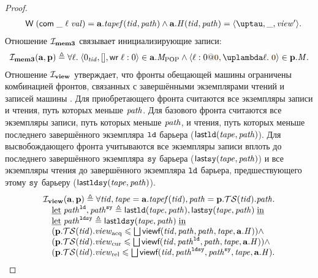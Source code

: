 \begin{proof}
\[\begin{array}{l}
  \quad  \tapeWrite{(\tapeWriteCommitted{\_}{\loc}{\stval})} = \aT.\tapef(\tId, \cpath) \land
      \aT.\hmap(\tId, \cpath) = \angled{\tau, \_, \R'}.
\end{array}\]
Отношение $\mathcal{I}_{\rm \bf mem3}$ связывает инициализирующие записи:
\[\begin{array}{l}
\invMemThree(\aT, \p) \triangleq
  \forall \loc. \; \stRequestWrite{0_{\tId}}{[]}{\loc}{0} \in \aT.\Mpop \land \writeEvt{\loc}{0}{\tstamp{0}}{\lambda \loc. \; \tstamp{0}} \in \p.\Mprom.
\end{array}\]
Отношение $\mathcal{I}_{\rm \bf view}$ утверждает, что фронты обещающей машины ограничены комбинацией
фронтов, связанных с завершёнными экземплярами чтений и записей машины \ARMt.
Для приобретающего фронта считаются все экземпляры записи и чтения, путь которых меньше $\mathit{path}$.
Для базового фронта считаются все экземпляры записи, путь которых меньше  $\mathit{path}$, и
чтения, путь которых меньше последнего завершённого экземпляра $\mathtt{ld}$ барьера ($\mathsf{last}\mathtt{ld}(\mathit{tape}, \mathit{path})$).
Для высвобождающего фронта учитываются все экземпляры записи вплоть до последнего завершённого
экземпляра $\mathtt{sy}$ барьера ($\mathsf{last}\mathtt{sy}(\mathit{tape}, \mathit{path})$)
и все экземпляры чтения до завершённого экземпляра $\mathtt{ld}$ барьера,
предшествующего этому $\mathtt{sy}$ барьеру ($\mathsf{last}\mathtt{ld}\mathtt{sy}(\mathit{tape}, \mathit{path})$).
\[\begin{array}{l}
\mathcal{I}_{\rm \bf view}(\mathbf{a}, \mathbf{p}) \triangleq
  \forall \mathit{tid}, \mathit{tape} = \mathbf{a}.\mathit{tapef}(\mathit{tid}), \mathit{path} = \mathbf{p}.\mathcal{TS}(\mathit{tid}).\mathit{path}. \\
  \quad \text{\underline{let}} \; \mathit{path}^{\mathtt{ld}}, \mathit{path}^{\mathtt{sy}} \triangleq
    \mathsf{last}\mathtt{ld}(\mathit{tape}, \mathit{path}),\mathsf{last}\mathtt{sy}(\mathit{tape}, \mathit{path}) \; \text{\underline{in}} \\
  \quad \text{\underline{let}} \; \mathit{path}^{\mathtt{ld}\mathtt{sy}} \triangleq \mathsf{last}\mathtt{ld}\mathtt{sy}(\mathit{tape}, \mathit{path}) \; \text{\underline{in}} \\
  \quad (\mathbf{p}.\mathcal{TS}(\mathit{tid}).\mathit{view}_{\mathrm{acq}} \leqslant \bigsqcup \textbf{\sf viewf}(\mathit{tid}, \mathit{path}, \mathit{path}, \mathit{tape}, \mathbf{a}.\mathit{H})) \land \\
  \quad (\mathbf{p}.\mathcal{TS}(\mathit{tid}).\mathit{view}_{\mathrm{cur}} \leqslant \bigsqcup \textbf{\sf viewf}(\mathit{tid}, \mathit{path}^{\mathtt{ld}}, \mathit{path}, \mathit{tape}, \mathbf{a}.\mathit{H})) \land \\
  \quad (\mathbf{p}.\mathcal{TS}(\mathit{tid}).\mathit{view}_{\mathrm{rel}} \leqslant \bigsqcup \textbf{\sf viewf}(\mathit{tid}, \mathit{path}^{\mathtt{ld}\mathtt{sy}}, \mathit{path}^{\mathtt{sy}}, \mathit{tape}, \mathbf{a}.\mathit{H}).\\
\end{array}\]

\end{proof}
